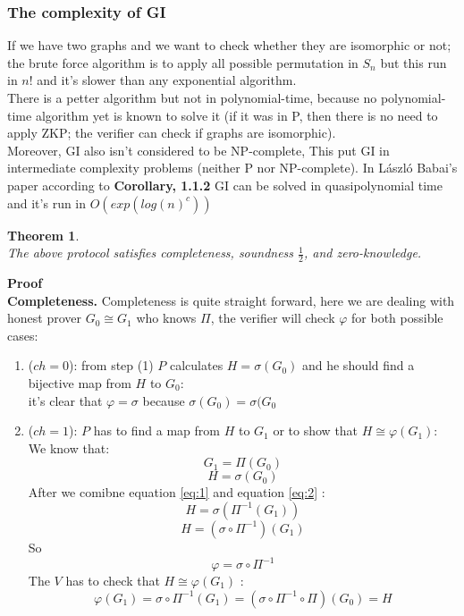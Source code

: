 \documentclass[12pt,a4paper]{article}
\newtheorem{thm}{Theorem}
\begin{document}
\subsubsection{The complexity of GI \cite{goldreich2007foundations:17}}
If we have two graphs and we want to check whether they are isomorphic or not; the brute force algorithm is to apply all possible permutation in $S_n$ but this run in $n!$ and it’s slower than any exponential algorithm.\\
There is a petter algorithm but not in polynomial-time, because no polynomial-time algorithm yet is known to solve it (if it was in P, then there is no need to apply ZKP; the verifier can check if graphs are isomorphic).\\  
Moreover, GI also isn't considered to be NP-complete, This put GI in  intermediate complexity problems (neither P nor NP-complete). 
In L{\'a}szl{\'o} Babai’s paper \cite{babai2016graph:16} according to  \textbf{Corollary, 1.1.2} GI can be solved in quasipolynomial time and it’s run in $O(exp(log(n)^c))$
\begin{thm}\cite{goldreich2007foundations:17}\\
The above protocol satisfies completeness, soundness $\frac{1}{2}$, and zero-knowledge.	
\end{thm}
\textbf{Proof}\\
\textbf{Completeness.}
Completeness is quite straight forward, here we are dealing with honest prover $G_0\cong G_1$ who knows $\Pi$, the verifier will check $\varphi$ for both possible cases:
\begin{enumerate}	
\item
\begin{enumerate}
($ch=0$): from step (1) $P$ calculates $H=\sigma(G_0)$ and he should find a bijective map from $H$ to $G_0$:\\
it's clear that $\varphi = \sigma$ because $\sigma(G_0)=\sigma(G_0$
\end{enumerate}
	\item
	\begin{enumerate}
($ch=1$): $P$ has to find a map from $H$ to $G_1$ or to show that $H\cong \varphi(G_1)$:\\
		We know that:
\begin{equation}
G_1=\Pi(G_0)\label{eq:1}
\end{equation}
\begin{equation}
H=\sigma(G_0)\label{eq:2}
\end{equation}
After we comibne  equation \ref{eq:1} and equation \ref{eq:2} :\\
		$$H=\sigma (\Pi^{-1}(G_1))$$
		$$H=(\sigma \circ 
		\Pi^{-1})(G_1)$$
		So $$\varphi=\sigma \circ \Pi^{-1}$$
The $V$ has to check that $H\cong \varphi(G_1)$ :\\
$$\varphi(G_1)=\sigma \circ \Pi^{-1}(G_1)=(\sigma \circ \Pi^{-1} \circ \Pi )(G_0)=H$$
	\end{enumerate}
\end{enumerate}
\end{document}
